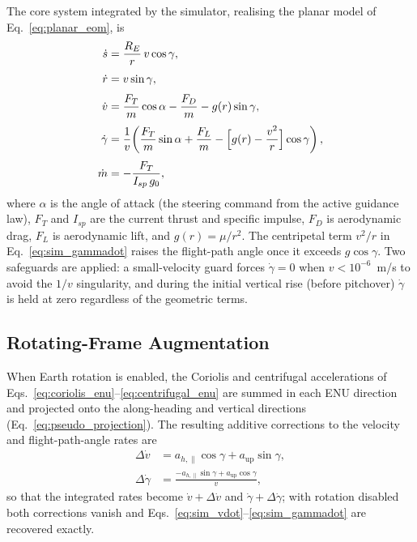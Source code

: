 The core system integrated by the simulator, realising the planar model of
Eq.~\eqref{eq:planar_eom}, is
\begin{align}
  \dot s      &= \frac{R_E}{r}\,v\cos\gamma,
               \label{eq:sim_sdot}\\[3pt]
  \dot r      &= v\sin\gamma,
               \label{eq:sim_rdot}\\[3pt]
  \dot v      &= \frac{F_T}{m}\cos\alpha
                 - \frac{F_D}{m}
                 - g(r)\sin\gamma,
               \label{eq:sim_vdot}\\[3pt]
  \dot\gamma  &= \frac{1}{v}\!\left(
                   \frac{F_T}{m}\sin\alpha
                   + \frac{F_L}{m}
                   - \Bigl[g(r) - \frac{v^2}{r}\Bigr]\cos\gamma
                 \right),
               \label{eq:sim_gammadot}\\[3pt]
  \dot m      &= -\frac{F_T}{I_{sp}\,g_0},
               \label{eq:sim_mdot}
\end{align}
where $\alpha$ is the angle of attack (the steering command from the active
guidance law), $F_T$ and $I_{sp}$ are the current thrust and specific impulse,
$F_D$ is aerodynamic drag, $F_L$ is aerodynamic lift,
and $g(r)=\mu/r^{2}$. The centripetal term $v^{2}/r$ in
Eq.~\eqref{eq:sim_gammadot} raises the flight-path angle once it exceeds
$g\cos\gamma$. Two safeguards are applied: a small-velocity guard forces
$\dot\gamma=0$ when $v<10^{-6}$~m/s to avoid the $1/v$ singularity, and during
the initial vertical rise (before pitchover) $\dot\gamma$ is held at zero
regardless of the geometric terms.

\subsection{Rotating-Frame Augmentation}
\label{ssec:rot_augmentation}

When Earth rotation is enabled, the Coriolis and centrifugal accelerations
of Eqs.~\eqref{eq:coriolis_enu}--\eqref{eq:centrifugal_enu} are summed in each
ENU direction and projected onto the along-heading and vertical directions
(Eq.~\eqref{eq:pseudo_projection}). The resulting additive corrections to the
velocity and flight-path-angle rates are
\begin{align}
  \Delta\dot v     &= a_{h,\parallel}\cos\gamma + a_{\mathrm{up}}\sin\gamma,
                    \label{eq:sim_dv_pseudo}\\[3pt]
  \Delta\dot\gamma &= \frac{-a_{h,\parallel}\sin\gamma
                      + a_{\mathrm{up}}\cos\gamma}{v},
                    \label{eq:sim_dgamma_pseudo}
\end{align}
so that the integrated rates become $\dot v + \Delta\dot v$ and
$\dot\gamma + \Delta\dot\gamma$; with rotation disabled both corrections vanish
and Eqs.~\eqref{eq:sim_vdot}--\eqref{eq:sim_gammadot} are recovered exactly.

